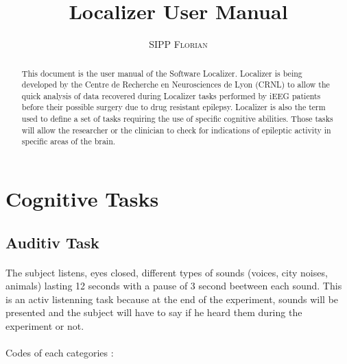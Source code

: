 \documentclass[a4paper]{article}
\title{Localizer User Manual}
\author{\textsc{SIPP Florian}}
\begin{document}
\maketitle
\begin{abstract}
This document is the user manual of the Software Localizer. Localizer is being developed by the Centre de Recherche en Neurosciences de Lyon (CRNL) to allow the quick analysis of data recovered during Localizer tasks performed by iEEG patients before their possible surgery due to drug resistant epilepsy.  Localizer is also the term used to define a set of tasks requiring the use of specific cognitive abilities. Those tasks will allow the researcher or the clinician to check for indications of epileptic activity in specific areas of the brain. 
\end{abstract}
\tableofcontents

\newpage
\section{Cognitive Tasks} \label{cognitivetasks}    
\subsection{Auditiv Task} \label{locaaudi}   
\paragraph{} The subject listens, eyes closed, different types of sounds (voices, city noises, animals) lasting 12 seconds with a pause of 3 second beetween each sound.  This is an activ listenning task because at the end of the experiment,  sounds will be presented and the subject will have to say if he heard them during the experiment or not.
\paragraph{}
Codes of each categories :
\end{document}
